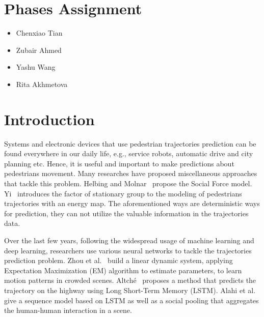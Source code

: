 \documentclass[sigconf]{acmart}
\begin{document}
\maketitle
\section*{Phases Assignment}
\begin{itemize}
    \item {} Chenxiao Tian
    \item {} Zubair Ahmed
    \item {} Yashu Wang
    \item {} Rita Akhmetova
\end{itemize}
\section*{Introduction}

Systems and electronic devices that use pedestrian trajectories prediction can be found everywhere in our daily life, e.g., service robots, automatic drive and city planning etc. Hence, it is useful and important to make predictions about pedestrians movement. Many researches have proposed miscellaneous approaches that tackle this problem. Helbing and Molnar~\cite{Helbing95} propose the Social Force model. Yi~\cite{Yi15} introduces the factor of stationary group to the modeling of pedestrians trajectories with an energy map. The aforementioned ways are deterministic ways for prediction, they can not utilize the valuable information in the trajectories data.

Over the last few years, following the widespread usage of machine learning and deep learning, researchers use various neural networks to tackle the trajectories prediction problem. Zhou et al.~\cite{Zhou} build a linear dynamic system, applying Expectation Maximization (EM) algorithm to estimate parameters, to learn motion patterns in crowded scenes. Altché~\cite{Altche17} proposes a method that predicts the trajectory on the highway using Long Short-Term Memory (LSTM). Alahi et al.~\cite{Alahi16} give a sequence model based on LSTM as well as a social pooling that aggregates the human-human interaction in a scene.
\end{document}

